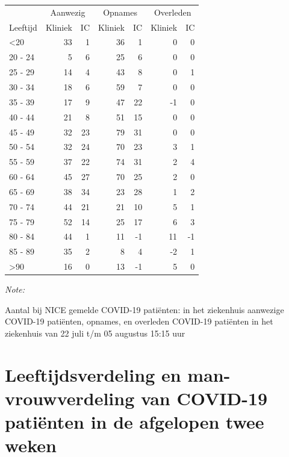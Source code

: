 \documentclass[
  english,
  man,floatsintext]{apa6}
\begin{document}
\begin{table}
\centering\begingroup\fontsize{10}{12}\selectfont

\begin{threeparttable}
\begin{tabular}{lrrrrrr}
\toprule
\multicolumn{1}{c}{ } & \multicolumn{2}{c}{Aanwezig} & \multicolumn{2}{c}{Opnames} & \multicolumn{2}{c}{Overleden} \\
\cmidrule(l{3pt}r{3pt}){2-3} \cmidrule(l{3pt}r{3pt}){4-5} \cmidrule(l{3pt}r{3pt}){6-7}
Leeftijd & Kliniek & IC & Kliniek & IC & Kliniek & IC\\
\midrule
<20 & 33 & 1 & 36 & 1 & 0 & 0\\
20 - 24 & 5 & 6 & 25 & 6 & 0 & 0\\
25 - 29 & 14 & 4 & 43 & 8 & 0 & 1\\
30 - 34 & 18 & 6 & 59 & 7 & 0 & 0\\
35 - 39 & 17 & 9 & 47 & 22 & -1 & 0\\
40 - 44 & 21 & 8 & 51 & 15 & 0 & 0\\
45 - 49 & 32 & 23 & 79 & 31 & 0 & 0\\
50 - 54 & 32 & 24 & 70 & 23 & 3 & 1\\
55 - 59 & 37 & 22 & 74 & 31 & 2 & 4\\
60 - 64 & 45 & 27 & 70 & 25 & 2 & 0\\
65 - 69 & 38 & 34 & 23 & 28 & 1 & 2\\
70 - 74 & 44 & 21 & 21 & 10 & 5 & 1\\
75 - 79 & 52 & 14 & 25 & 17 & 6 & 3\\
80 - 84 & 44 & 1 & 11 & -1 & 11 & -1\\
85 - 89 & 35 & 2 & 8 & 4 & -2 & 1\\
>90 & 16 & 0 & 13 & -1 & 5 & 0\\
\bottomrule
\end{tabular}
\begin{tablenotes}
\item \textit{Note: } 
\item Aantal bij NICE gemelde COVID-19 patiënten: in het ziekenhuis aanwezige COVID-19 patiënten, opnames, en overleden COVID-19 patiënten in het ziekenhuis van 22 juli t/m 05 augustus 15:15 uur
\end{tablenotes}
\end{threeparttable}
\endgroup{}
\end{table}

\newpage

\hypertarget{leeftijdsverdeling-en-man-vrouwverdeling-van-covid-19-patiuxebnten-in-de-afgelopen-twee-weken}{%
\section{Leeftijdsverdeling en man-vrouwverdeling van COVID-19 patiënten in de afgelopen twee weken}\label{leeftijdsverdeling-en-man-vrouwverdeling-van-covid-19-patiuxebnten-in-de-afgelopen-twee-weken}}
\end{document}
